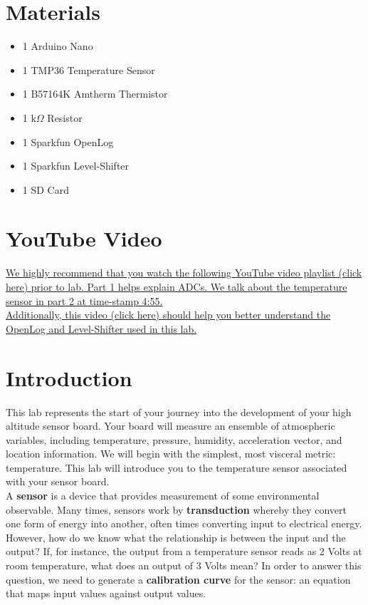 \documentclass[12pt]{article}
\begin{document}
	\maketitle
	\thispagestyle{fancy}
	
	\section*{Materials}
	\begin{itemize}
		\item 1 \quad Arduino Nano
		\item 1 \quad TMP36 Temperature Sensor
		\item 1 \quad B57164K Amtherm Thermistor
        \item 1  k$\Omega$ Resistor
		\item 1 \quad Sparkfun OpenLog
		\item 1 \quad Sparkfun Level-Shifter
		\item 1 \quad SD Card
	\end{itemize}
	
	\section*{YouTube Video}
	\href{https://www.youtube.com/playlist?list=PLp2z0IQxLSvkzzYafHIlGQl9MbUdtYAeH}{We highly recommend that you watch the following YouTube video playlist (click here) prior to lab. Part 1 helps explain ADCs. We talk about the temperature sensor in part 2 at time-stamp 4:55.}\\
	
	\href{https://www.youtube.com/watch?v=FhgAi-ju6Z4}{Additionally, this video (click here) should help you better understand the OpenLog and Level-Shifter used in this lab.}

\section*{Introduction}
	This lab represents the start of your journey into the development of your high altitude sensor board. Your board will measure an ensemble of atmospheric variables, including temperature, pressure, humidity, acceleration vector, and location information. We will begin with the simplest, most visceral metric: temperature. This lab will introduce you to the temperature sensor associated with your sensor board.\\
	
	A \textbf{sensor} is a device that provides measurement of some environmental observable. Many times, sensors work by \textbf{transduction} whereby they convert one form of energy into another, often times converting input to electrical energy. However, how do we know what the relationship is between the input and the output? If, for instance, the output from a temperature sensor reads as 2 Volts at room temperature, what does an output of 3 Volts mean? In order to answer this question, we need to generate a \textbf{calibration curve} for the sensor: an equation that maps input values against output values.\\
	
\end{document}
